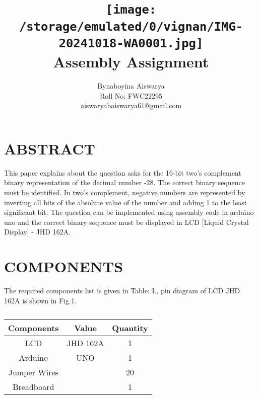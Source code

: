 \documentclass[conference]{IEEEtran}
\title{
\vspace{1cm}
{\texttt{[image:  /storage/emulated/0/vignan/IMG-20241018-WA0001.jpg]} \\ Assembly Assignment}}
\author{Bynaboyina Aiswarya \\ Roll No: FWC22295 \\ aiswaryabaiswarya61@gmail.com}
\begin{document}
\maketitle
 \section{ABSTRACT}

This paper explains about the question asks for the 16-bit two's complement binary representation of the decimal number -28. The correct binary sequence must be identified. In two's complement, negative numbers are represented by inverting all bits of the absolute value of the number and adding 1 to the least significant bit.
The question can be implemented using assembly code in arduino uno and the correct binary sequence must be displayed in LCD [Liquid Crystal Display] - JHD 162A.

\section{COMPONENTS} 

The required components list is given in Table: I., pin diagram of LCD JHD 162A is shown in Fig.1.
\vspace{0.3cm}
 \begin{table} [htbp]
\centering
\begin{tabular}{| c | c | c |} \hline
Components & Value & Quantity \\\hline
LCD & JHD 162A & 1 \\ \hline
Arduino & UNO & 1 \\ \hline
Jumper Wires &  & 20 \\ \hline
Breadboard & & 1 \\ 
\hline
\end{tabular}
\vspace{0.3cm}
\caption{\label{tab:widgets}}
\end{table}
\end{document}
